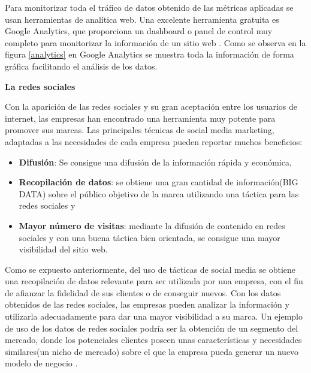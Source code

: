 Para monitorizar toda el tráfico de datos obtenido de las métricas aplicadas se usan herramientas de analítica web. Una excelente herramienta gratuita es Google Analytics, que proporciona un dashboard o panel de control muy completo para monitorizar la información de un sitio web \cite{analytics}. Como se observa en la figura \ref{analytics} en Google Analytics se muestra toda la información de forma gráfica facilitando el análisis de los datos.

\textbf{La redes sociales} 

\vspace{5 mm}

Con la aparición de las redes sociales y su gran aceptación entre los usuarios de internet, las empresas han encontrado una herramienta muy potente para promover sus marcas. Las principales técnicas de social media marketing, adaptadas a las necesidades de cada empresa  pueden reportar muchos beneficios:

\begin{itemize}

\item \textbf{Difusión}: Se consigue una difusión de la información rápida y económica,

\item \textbf{Recopilación de datos}: se obtiene una gran cantidad de información(BIG DATA) sobre el público objetivo de la marca utilizando una táctica para las redes sociales y

\item \textbf{Mayor número de visitas}: mediante la difusión de contenido en redes sociales y con una buena táctica bien orientada, se consigue una mayor visibilidad del sitio web.

\end{itemize}

Como se expuesto anteriormente, del uso de tácticas de social media se obtiene una recopilación de datos relevante para ser utilizada por una empresa, con el fin de afianzar la fidelidad de sus clientes o de conseguir nuevos. Con los datos obtenidos de las redes sociales, las empresas pueden analizar la información y utilizarla adecuadamente para dar una mayor visibilidad a su marca. Un ejemplo de uso de los datos de redes sociales podría ser la obtención de un segmento del mercado, donde los potenciales clientes poseen unas características y necesidades similares(un nicho de mercado) sobre el que la empresa pueda generar un nuevo modelo de negocio \cite{social-media-marketing}.


